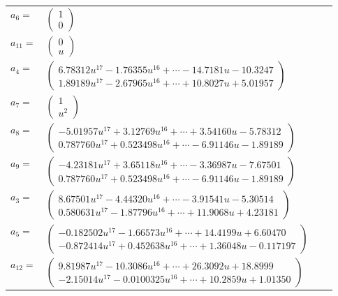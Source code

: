 \documentclass[1p]{elsarticle_modified}
\theoremstyle{definition}
\begin{document}
\begin{tabular}{m{7pt} m{180pt} m{7pt} m{180pt} }
\flushright $a_{6}=$&$\begin{pmatrix}1\\0\end{pmatrix}$ \\
\flushright $a_{11}=$&$\begin{pmatrix}0\\u\end{pmatrix}$ \\
\flushright $a_{4}=$&$\begin{pmatrix}6.78312 u^{17}-1.76355 u^{16}+\cdots-14.7181 u-10.3247\\1.89189 u^{17}-2.67965 u^{16}+\cdots+10.8027 u+5.01957\end{pmatrix}$ \\
\flushright $a_{7}=$&$\begin{pmatrix}1\\u^2\end{pmatrix}$ \\
\flushright $a_{8}=$&$\begin{pmatrix}-5.01957 u^{17}+3.12769 u^{16}+\cdots+3.54160 u-5.78312\\0.787760 u^{17}+0.523498 u^{16}+\cdots-6.91146 u-1.89189\end{pmatrix}$ \\
\flushright $a_{9}=$&$\begin{pmatrix}-4.23181 u^{17}+3.65118 u^{16}+\cdots-3.36987 u-7.67501\\0.787760 u^{17}+0.523498 u^{16}+\cdots-6.91146 u-1.89189\end{pmatrix}$ \\
\flushright $a_{3}=$&$\begin{pmatrix}8.67501 u^{17}-4.44320 u^{16}+\cdots-3.91541 u-5.30514\\0.580631 u^{17}-1.87796 u^{16}+\cdots+11.9068 u+4.23181\end{pmatrix}$ \\
\flushright $a_{5}=$&$\begin{pmatrix}-0.182502 u^{17}-1.66573 u^{16}+\cdots+14.4199 u+6.60470\\-0.872414 u^{17}+0.452638 u^{16}+\cdots+1.36048 u-0.117197\end{pmatrix}$ \\
\flushright $a_{12}=$&$\begin{pmatrix}9.81987 u^{17}-10.3086 u^{16}+\cdots+26.3092 u+18.8999\\-2.15014 u^{17}-0.0100325 u^{16}+\cdots+10.2859 u+1.01350\end{pmatrix}$ \\

\end{tabular}
\end{document}
